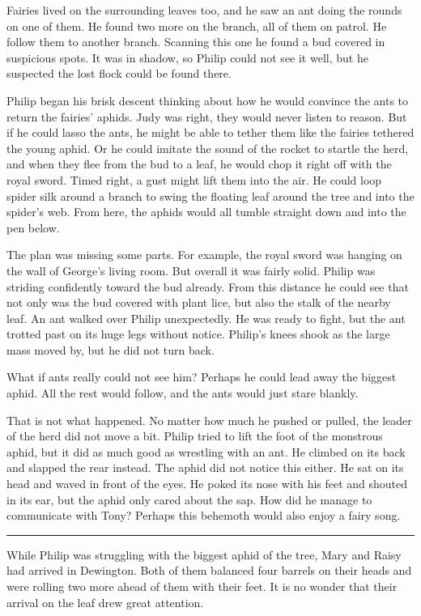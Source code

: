 \documentclass[10pt, draft]{memoir}
\renewcommand{\pfbreakdisplay}{\bigskip \ding{166} \bigskip}
\newcommand{\secbreak}{\fancybreak{\pfbreakdisplay}}
\begin{document}
Fairies lived on the surrounding leaves too, and he saw an ant doing the rounds
on one of them. He found two more on the branch, all of them on patrol. He
follow them to another branch. Scanning this one he found a bud covered in
suspicious spots. It was in shadow, so Philip could not see it well, but he
suspected the lost flock could be found there.

Philip began his brisk descent thinking about how he would convince the ants to
return the fairies' aphids. Judy was right, they would never listen to reason.
But if he could lasso the ants, he might be able to tether them like the
fairies tethered the young aphid. Or he could imitate the sound of the rocket
to startle the herd, and when they flee from the bud to a leaf, he would chop
it right off with the royal sword. Timed right, a gust might lift them into the
air. He could loop spider silk around a branch to swing the floating leaf
around the tree and into the spider's web. From here, the aphids would all
tumble straight down and into the pen below.

The plan was missing some parts. For example, the royal sword was hanging on
the wall of George's living room. But overall it was fairly solid. Philip was
striding confidently toward the bud already. From this distance he could see
that not only was the bud covered with plant lice, but also the stalk of the
nearby leaf. An ant walked over Philip unexpectedly. He was ready to fight, but
the ant trotted past on its huge legs without notice. Philip's knees shook as
the large mass moved by, but he did not turn back.

What if ants really could not see him? Perhaps he could lead away the biggest
aphid. All the rest would follow, and the ants would just stare blankly.

That is not what happened. No matter how much he pushed or pulled, the leader
of the herd did not move a bit. Philip tried to lift the foot of the monstrous
aphid, but it did as much good as wrestling with an ant. He climbed on its back
and slapped the rear instead. The aphid did not notice this either. He sat on
its head and waved in front of the eyes. He poked its nose with his feet and
shouted in its ear, but the aphid only cared about the sap. How did he manage
to communicate with Tony? Perhaps this behemoth would also enjoy a fairy song.

\secbreak

While Philip was struggling with the biggest aphid of the tree, Mary and Raisy
had arrived in  Dewington. Both of them balanced four barrels on their heads
and were rolling two more ahead of them with their feet. It is no wonder that
their arrival on the leaf drew great attention.
\end{document}
